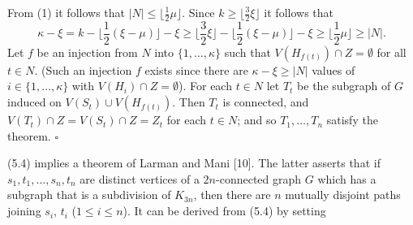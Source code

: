From (1) it follows that $|N| \le \lfloor \frac{1}{2}\mu \rfloor$. Since $k \ge \lfloor \frac{3}{2}\xi \rfloor$ it follows that
\begin{equation*}
\kappa - \xi = k - \lfloor \frac{1}{2}(\xi - \mu) \rfloor - \xi \ge \lfloor \frac{3}{2}\xi \rfloor - \lfloor \frac{1}{2}(\xi - \mu) \rfloor - \xi \ge \lfloor \frac{1}{2}\mu \rfloor \ge |N|.
\end{equation*}
Let $f$ be an injection from $N$ into $\{1, \dots, \kappa\}$ such that $V(H_{f(t)}) \cap Z = \emptyset$ for all $t \in N$. (Such an injection $f$ exists since there are $\kappa - \xi \ge |N|$ values of $i \in \{1, \dots, \kappa\}$ with $V(H_i) \cap Z = \emptyset$). For each $t \in N$ let $T_t$ be the subgraph of $G$ induced on $V(S_t) \cup V(H_{f(t)})$. Then $T_t$ is connected, and $V(T_t) \cap Z = V(S_t) \cap Z = Z_t$ for each $t \in N$; and so $T_1, \dots, T_n$ satisfy the theorem. $\square$

\stmt
(5.4) implies a theorem of Larman and Mani [10]. The latter asserts that if $s_1, t_1, \dots, s_n, t_n$ are distinct vertices of a $2n$-connected graph $G$ which has a subgraph that is a subdivision of $K_{3n}$, then there are $n$ mutually disjoint paths joining $s_i$, $t_i$ ($1 \le i \le n$). It can be derived from (5.4) by setting
